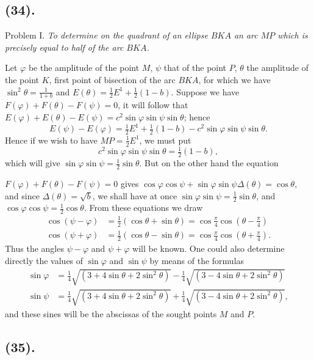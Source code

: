\documentclass{article}
\begin{document}
\subsection*{(34).}

Problem I. \emph{To determine on the quadrant of an ellipse $BKA$ an arc $MP$ which is precisely equal to half of the arc $BKA$.}

Let $\varphi$ be the amplitude of the point $M$, $\psi$ that of the point $P$, $\theta$ the amplitude of the point $K$, first point of bisection of the arc $BKA$, for which we have $\sin^{2}\theta=\frac{1}{1+b}$ and $E(\theta)=\frac{1}{2}E^{1}+\frac{1}{2}(1-b)$. Suppose we have $F(\varphi)+F(\theta)-F(\psi)=0$, it will follow that $E(\varphi)+E(\theta)-E(\psi)=c^{2}\sin\varphi\sin\psi\sin\theta$; hence
\[ E(\psi)-E(\varphi)=\tfrac{1}{2}E^{1}+\tfrac{1}{2}(1-b)-c^{2}\sin\varphi\sin\psi\sin\theta. \]
Hence if we wish to have $MP=\frac{1}{2}E^{1}$, we must put
\[ c^{2}\sin\varphi\sin\psi\sin\theta=\tfrac{1}{2}(1-b), \]
which will give $\sin\varphi\sin\psi=\frac{1}{2}\sin\theta$. But on the other hand the equation

$F(\varphi)+F(\theta)-F(\psi)=0$ gives $\cos\varphi\cos\psi+\sin\varphi\sin\psi\Delta(\theta)=\cos\theta$, and since $\Delta(\theta)=\sqrt{b}$, we shall have at once $\sin\varphi\sin\psi=\frac{1}{2}\sin\theta$, and $\cos\varphi\cos\psi=\frac{1}{2}\cos\theta$. From these equations we draw
\[ \begin{aligned} \cos(\psi-\varphi)&=\tfrac{1}{2}(\cos\theta+\sin\theta)=\cos\frac{\pi}{4}\cos\left(\theta-\frac{\pi}{4}\right)\\ \cos(\psi+\varphi)&=\tfrac{1}{2}(\cos\theta-\sin\theta)=\cos\frac{\pi}{4}\cos\left(\theta+\frac{\pi}{4}\right). \end{aligned} \]
Thus the angles $\psi-\varphi$ and $\psi+\varphi$ will be known. One could also determine directly the values of $\sin\varphi$ and $\sin\psi$ by means of the formulas
\[ \begin{aligned} \sin\varphi&=\tfrac{1}{4}\sqrt{(3+4\sin\theta+2\sin^{2}\theta)}-\tfrac{1}{4}\sqrt{(3-4\sin\theta+2\sin^{2}\theta)}\\ \sin\psi&=\tfrac{1}{4}\sqrt{(3+4\sin\theta+2\sin^{2}\theta)}+\tfrac{1}{4}\sqrt{(3-4\sin\theta+2\sin^{2}\theta)}, \end{aligned} \]
and these sines will be the abscissas of the sought points $M$ and $P$.

\subsection*{(35).}
\end{document}
